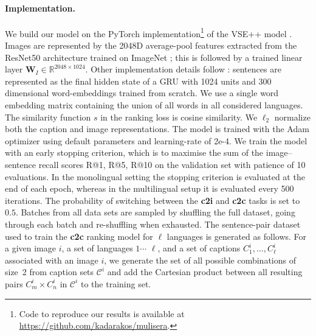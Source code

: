 \paragraph{Implementation.}
We build our model on the PyTorch implementation\footnote{Code to reproduce our results is available at\\ \url{https://github.com/kadarakos/mulisera}.}
of the VSE++ model \citep{faghri2017vse++}.
Images are represented by the 2048D average-pool features
extracted from the ResNet50 architecture \citep{he2016deep} trained on ImageNet \citep{deng2009imagenet}; this is followed by a trained linear layer
$\mathbf{W}_{I} \in \mathbb{R}^{2048 \times 1024}$. Other implementation details follow \citep{faghri2017vse++}: sentences are represented as the final hidden state of a GRU \citep{chung2014empirical} with 1024 units and 300 dimensional word-embeddings trained from scratch. We use a single word embedding matrix containing  the union of all words in all considered languages.
The similarity function $s$ in the ranking loss is cosine similarity. We $\ell_2$ normalize both the caption and
image representations. The model is trained
with the Adam optimizer \citep{kingma2014adam}
using default parameters and learning-rate of \mbox{2e-4}.
We train the model with an early stopping criterion, which is to maximise the
sum of the image--sentence recall scores R@1, R@5, R@10 on the validation set with patience of 10 evaluations.
In the monolingual setting the stopping criterion is evaluated at the end of each epoch, whereas in the multilingual setup it is evaluated every 500 iterations.
The probability of switching between the {\bf c2i} and {\bf c2c} tasks is set to $0.5$. Batches from all data sets are sampled by shuffling the full dataset, going through each batch and re-shuffling when exhausted.
The sentence-pair dataset used to train the {\bf c2c} ranking model for $\ell$ languages is generated as follows.
For a given image $i$, a set of languages $1 \cdots$ $\ell$, and a set of captions $C^i_1, \ldots, C^i_\ell$ associated with an image $i$, we generate the set of all possible combinations of size~2 from caption sets $\mathcal{C}^i$ and add the Cartesian product between all resulting pairs $C^i_m \times C^i_n$ in $\mathcal{C}^i$ to the training set.
